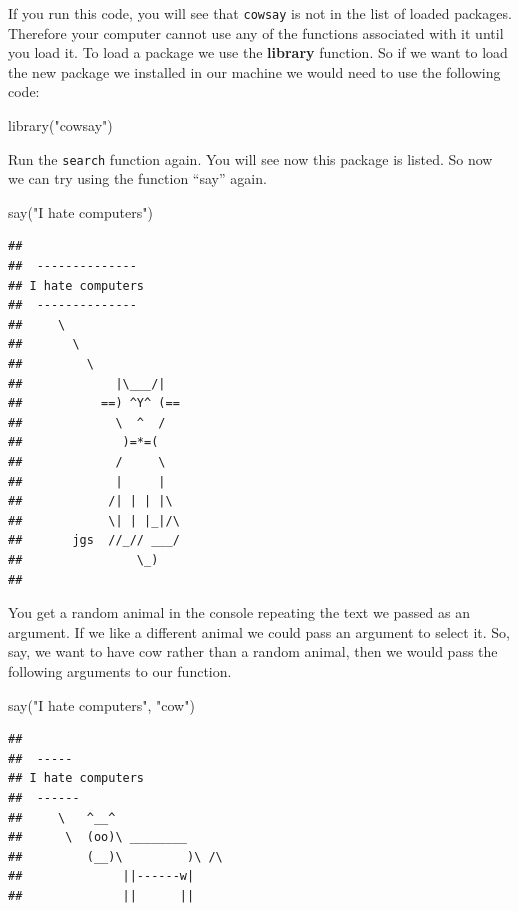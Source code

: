 \documentclass[
]{book}
\newenvironment{Shaded}{\begin{snugshade}}{\end{snugshade}}
\newcommand{\FunctionTok}[1]{\textcolor[rgb]{0.00,0.00,0.00}{#1}}
\newcommand{\NormalTok}[1]{#1}
\newcommand{\StringTok}[1]{\textcolor[rgb]{0.31,0.60,0.02}{#1}}
\begin{document}
If you run this code, you will see that \texttt{cowsay} is not in the list of loaded packages. Therefore your computer cannot use any of the functions associated with it until you load it. To load a package we use the \textbf{library} function. So if we want to load the new package we installed in our machine we would need to use the following code:

\begin{Shaded}
\begin{Highlighting}[]
\FunctionTok{library}\NormalTok{(}\StringTok{"cowsay"}\NormalTok{)}
\end{Highlighting}
\end{Shaded}

Run the \texttt{search} function again. You will see now this package is listed. So now we can try using the function ``say'' again.

\begin{Shaded}
\begin{Highlighting}[]
\FunctionTok{say}\NormalTok{(}\StringTok{"I hate computers"}\NormalTok{)}
\end{Highlighting}
\end{Shaded}

\begin{verbatim}
## 
##  -------------- 
## I hate computers 
##  --------------
##     \
##       \
##         \
##             |\___/|
##           ==) ^Y^ (==
##             \  ^  /
##              )=*=(
##             /     \
##             |     |
##            /| | | |\
##            \| | |_|/\
##       jgs  //_// ___/
##                \_)
## 
\end{verbatim}

You get a random animal in the console repeating the text we passed as an argument. If we like a different animal we could pass an argument to select it. So, say, we want to have cow rather than a random animal, then we would pass the following arguments to our function.

\begin{Shaded}
\begin{Highlighting}[]
\FunctionTok{say}\NormalTok{(}\StringTok{"I hate computers"}\NormalTok{, }\StringTok{"cow"}\NormalTok{)}
\end{Highlighting}
\end{Shaded}

\begin{verbatim}
## 
##  ----- 
## I hate computers 
##  ------ 
##     \   ^__^ 
##      \  (oo)\ ________ 
##         (__)\         )\ /\ 
##              ||------w|
##              ||      ||
\end{verbatim}
\end{document}
